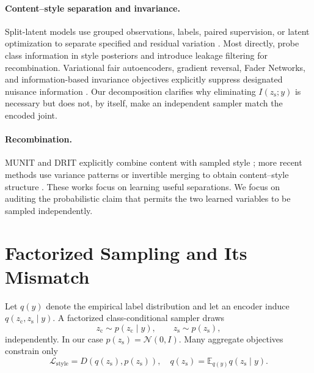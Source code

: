\documentclass{article}
\newcommand{\zc}{z_{\mathrm{c}}}
\newcommand{\zs}{z_{\mathrm{s}}}
\begin{document}
\paragraph{Content--style separation and invariance.}
Split-latent models use grouped observations, labels, paired supervision, or
latent optimization to separate specified and residual variation
\citep{mathieu2016disentangling,bouchacourt2018multilevel,jha2018cycle,ilse2020diva,gabbay2020lord}.
Most directly, \citet{ridgeway2018leakage} probe class information in style
posteriors and introduce leakage filtering for recombination.  Variational
fair autoencoders, gradient reversal, Fader Networks, and information-based
invariance objectives explicitly suppress designated nuisance information
\citep{louizos2015variational,ganin2015unsupervised,lample2017fader,moyer2018invariant}.
Our decomposition clarifies why eliminating $I(\zs;y)$ is necessary but does
not, by itself, make an independent sampler match the encoded joint.

\paragraph{Recombination.}
MUNIT and DRIT explicitly combine content with sampled style
\citep{huang2018munit,lee2018drit}; more recent methods use variance patterns
or invertible merging to obtain content--style structure
\citep{wu2025variance,ma2025scflow}.  These works focus on learning useful
separations.  We focus on auditing the probabilistic claim that permits the
two learned variables to be sampled independently.

\section{Factorized Sampling and Its Mismatch}
\label{sec:theory}

Let $q(y)$ denote the empirical label distribution and let an encoder induce
$q(\zc,\zs\mid y)$.  A factorized class-conditional sampler draws
\begin{equation}
    \zc\sim p(\zc\mid y),\qquad \zs\sim p(\zs),
    \label{eq:sampler}
\end{equation}
independently.  In our case $p(\zs)=\mathcal N(0,I)$.  Many aggregate
objectives constrain only
\begin{equation}
    \mathcal L_{\mathrm{style}}=D\!\left(q(\zs),p(\zs)\right),
    \quad q(\zs)=\mathbb E_{q(y)}q(\zs\mid y).
    \label{eq:global-style}
\end{equation}
\end{document}

